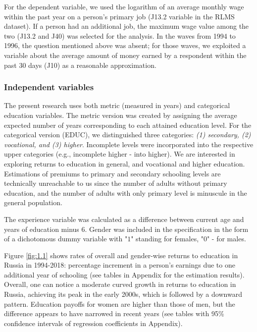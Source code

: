 \documentclass[12pt,a4paper]{article}
\numberwithin{equation}{section}
\begin{document}
For the dependent variable, we used the logarithm of an average monthly wage within the past year on a person's primary job (J13.2 variable in the RLMS dataset). If a person had an additional job, the maximum wage value among the two (J13.2 and J40) was selected for the analysis. In the waves from 1994 to 1996, the question mentioned above was absent; for those waves, we exploited a variable about the average amount of money earned by a respondent within the past 30 days (J10) as a reasonable approximation.

\subsubsection{Independent variables}

The present research uses both metric (measured in years) and categorical education variables. The metric version was created by assigning the average expected number of years corresponding to each attained education level. For the categorical version (EDUC), we distinguished three categories: \textit{(1) secondary, (2) vocational, and (3) higher}. Incomplete levels were incorporated into the respective upper categories (e.g., incomplete higher - into higher). We are interested in exploring returns to education in general, and vocational and higher education. Estimations of premiums to primary and secondary schooling levels are technically unreachable to us since the number of adults without primary education, and the number of adults with only primary level is minuscule in the general population. 

The experience variable was calculated as a difference between current age and years of education minus $6$. Gender was included in the specification in the form of a dichotomous dummy variable with "$1$" standing for females, "$0$" - for males.


Figure \ref{fig:1.1} shows rates of overall and gender-wise returns to education in Russia in 1994-2018: percentage increment in a person's earnings due to one additional year of schooling (see tables in Appendix for the estimation results). Overall, one can notice a moderate curved growth in returns to education in Russia, achieving its peak in the early 2000s, which is followed by a downward pattern. Education payoffs for women are higher than those of men, but the difference appears to have narrowed in recent years (see tables with 95\% confidence intervals of regression coefficients in Appendix).
\end{document}
